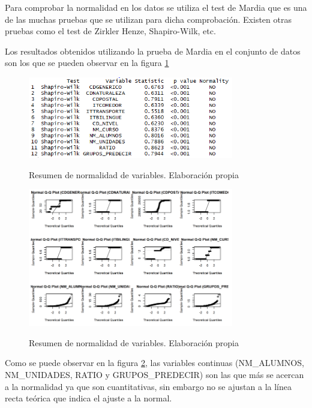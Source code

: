 \begin{subappendices}
Para comprobar la normalidad en los datos se utiliza el test de Mardia que es una de las muchas pruebas que se utilizan para dicha comprobación. Existen otras pruebas como el test de Zirkler Henze, Shapiro-Wilk, etc.

Los resultados obtenidos utilizando la prueba de Mardia en el conjunto de datos son los que se pueden observar en la figura \ref{fig:normalidadSUM}

\begin{figure}[htb]
	\centering
	\caption{Resumen de normalidad de variables. Elaboración propia}
	\includegraphics[width=0.8\textwidth]{recursos/ImagenesR/normalidadSUM}
	\label{fig:normalidadSUM}
\end{figure}
\FloatBarrier


\begin{figure}[htb]
	\centering
	\caption{Resumen de normalidad de variables. Elaboración propia}
	\includegraphics[width=0.8\textwidth]{recursos/ImagenesR/normalidadGRAF}
	\label{fig:normalidadGRAF}
\end{figure}
\FloatBarrier

Como se puede observar en la figura \ref{fig:normalidadGRAF}, las variables continuas (NM\_ALUMNOS, NM\_UNIDADES, RATIO y GRUPOS\_PREDECIR) son las que más se acercan a la normalidad ya que son cuantitativas, sin embargo no se ajustan a la línea recta teórica que indica el ajuste a la normal.



\end{subappendices}
